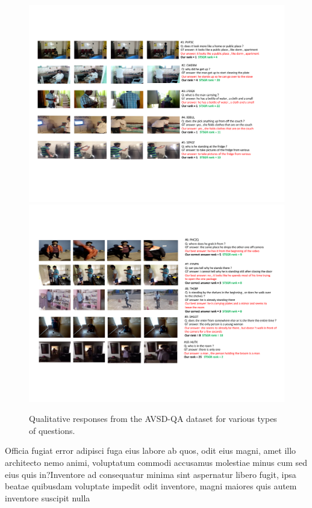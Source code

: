 \documentclass[letterpaper]{article} %
\begin{document}
\begin{figure}
    \centering
    \includegraphics[width=18cm,trim={1cm 4.5cm 1.5cm 3cm},clip]{./figs/quals_results_suppl_3.pdf}
    \includegraphics[width=18cm,trim={1.5cm 4cm 1.5cm 3cm},clip]{./figs/quals_results_suppl_4.pdf}
    \caption{Qualitative responses from the AVSD-QA dataset for various types of questions.}
    \label{fig:avsd-qa-more-quals-x}
\end{figure}

Officia fugiat error adipisci fuga eius labore ab quos, odit eius magni, amet illo architecto nemo animi, voluptatum commodi accusamus molestiae minus cum sed eius quis in?Inventore ad consequatur minima sint aspernatur libero fugit, ipsa beatae quibusdam voluptate impedit odit inventore, magni maiores quis autem inventore suscipit nulla

\end{document}
